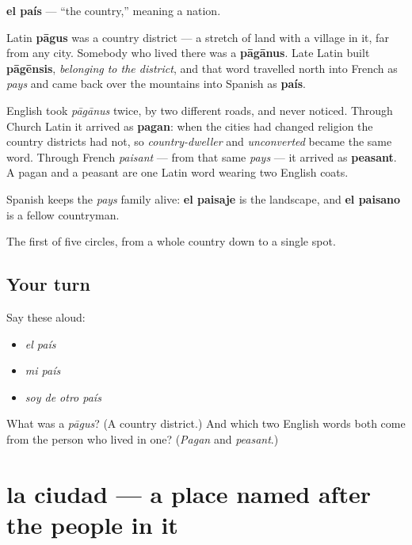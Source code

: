 \begin{cousinweb}
\textbf{el país} — \textquotedblleft{}the country,\textquotedblright{} meaning a nation.

Latin \textbf{pāgus} was a country district — a stretch of land with a village in it, far from any city. Somebody who lived there was a \textbf{pāgānus}. Late Latin built \textbf{pāgēnsis}, \emph{belonging to the district}, and that word travelled north into French as \emph{pays} and came back over the mountains into Spanish as \textbf{país}.

English took \emph{pāgānus} twice, by two different roads, and never noticed. Through Church Latin it arrived as \textbf{pagan}: when the cities had changed religion the country districts had not, so \emph{country-dweller} and \emph{unconverted} became the same word. Through French \emph{paisant} — from that same \emph{pays} — it arrived as \textbf{peasant}. A pagan and a peasant are one Latin word wearing two English coats.

Spanish keeps the \emph{pays} family alive: \textbf{el paisaje} is the landscape, and \textbf{el paisano} is a fellow countryman.
\end{cousinweb}

\begin{grammarlens}[title={What you've built}]
The first of five circles, from a whole country down to a single spot.
\end{grammarlens}

\subsection*{Your turn}
Say these aloud:

\begin{itemize}
\raggedright
  \item \emph{el país}
  \item \emph{mi país}
  \item \emph{soy de otro país}
\end{itemize}

\begin{tcolorbox}[breakable,colback=teal!4,colframe=teal!35!black,title={Before you move on}]
What was a \emph{pāgus}? (A country district.) And which two English words both come from the person who lived in one? (\emph{Pagan} and \emph{peasant}.)
\end{tcolorbox}
\section[la ciudad]{la ciudad — a place named after the people in it}

